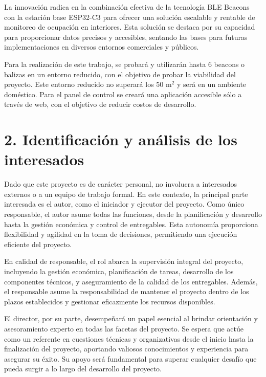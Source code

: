 \documentclass[
11pt, %
]{charter}
\begin{document}
\vspace{25px}

\setlength{\parindent}{1cm}La innovación radica en la combinación efectiva de la tecnología BLE Beacons con la estación base ESP32-C3 para ofrecer una solución escalable y rentable de monitoreo de ocupación en interiores. Esta solución se destaca por su capacidad para proporcionar datos precisos y accesibles, sentando las bases para futuras implementaciones en diversos entornos comerciales y públicos. 

\setlength{\parindent}{1cm}Para la realización de este trabajo, se probará y utilizarán hasta 6 beacons o balizas en un entorno reducido, con el objetivo de probar la viabilidad del proyecto. Este entorno reducido no superará los 50 m$^2$ y será en un ambiente doméstico. Para el panel de control se creará una aplicación accesible sólo a través de web, con el objetivo de reducir costos de desarrollo.

\section{2. Identificación y análisis de los interesados}
\label{sec:interesados}

\setlength{\parindent}{1cm}Dado que este proyecto es de carácter personal, no involucra a interesados externos o a un equipo de trabajo formal. En este contexto, la principal parte interesada es el autor, como el iniciador y ejecutor del proyecto. Como único responsable, el autor asume todas las funciones, desde la planificación y desarrollo hasta la gestión económica y control de entregables. Esta autonomía proporciona flexibilidad y agilidad en la toma de decisiones, permitiendo una ejecución eficiente del proyecto.

\setlength{\parindent}{1cm}En calidad de responsable, el rol abarca la supervisión integral del proyecto, incluyendo la gestión económica, planificación de tareas, desarrollo de los componentes técnicos, y aseguramiento de la calidad de los entregables. Además, el responsable asume la responsabilidad de mantener el proyecto dentro de los plazos establecidos y gestionar eficazmente los recursos disponibles.

\setlength{\parindent}{1cm}El director, por su parte, desempeñará un papel esencial al brindar orientación y asesoramiento experto en todas las facetas del proyecto. Se espera que actúe como un referente en cuestiones técnicas y organizativas desde el inicio hasta la finalización del proyecto, aportando valiosos conocimientos y experiencia para asegurar su éxito. Su apoyo será fundamental para superar cualquier desafío que pueda surgir a lo largo del desarrollo del proyecto.
\end{document}
